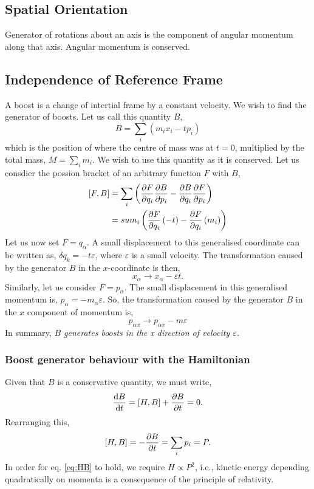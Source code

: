 \documentclass{book}
\begin{document}
\subsection{Spatial Orientation}
Generator of rotations about an axis is the component of angular momentum along that axis. Angular momentum is conserved.
\subsection{Independence of Reference Frame}
A boost is a change of intertial frame by a constant velocity. We wish to find the generator of boosts. Let us call this quantity $B$,
\begin{equation}
	\boxed{B = \sum_i\left(m_ix_i - tp_i\right)}
\end{equation}
which is the position of where the centre of mass was at $t=0$, multiplied by the total mass, $M = \sum_i m_i$. We wish to use this quantity as it is conserved. Let us consdier the possion bracket of an arbitrary function $F$ with $B$,
\begin{equation}
	\begin{split}
		\left[F,B\right] & = \sum_i\left(\pdv{F}{q_i}\pdv{B}{p_i} - \pdv{B}{q_i}\pdv{F}{p_i}\right) \\ 
		& = sum_i\left(\pdv{F}{q_i}\left(-t\right) - \pdv{F}{q_i}\left(m_i\right)\right)
	\end{split}
\end{equation}
Let us now set $F = q_{\alpha}$. A small displacement to this generalised coordinate can be written as, $\delta q_k = -t\varepsilon$, where $\varepsilon$ is a small velocity. The transformation caused by the generator $B$ in the $x$-coordinate is then,
\begin{equation}
	x_{\alpha} \to x_{\alpha} - \varepsilon t.
\end{equation}
Similarly, let us consider $F = p_{\alpha}$. The small displacement in this generalised momentum is, $p_{\alpha} = -m_{\alpha}\varepsilon$. So, the transformation caused by the generator $B$ in the $x$ component of momentum is,
\begin{equation}
	p_{\alpha x} \to p_{\alpha x} - m\varepsilon
\end{equation}
In summary, \textit{$B$ generates boosts in the x direction of velocity $\varepsilon$.}
\subsubsection{Boost generator behaviour with the Hamiltonian}
Given that $B$ is a conservative quantity, we must write,
\begin{equation}
	\dv{B}{t} = \left[H,B\right] + \pdv{B}{t} = 0.
\end{equation}
Rearranging this,
\begin{equation}
	\left[H,B\right] = -\pdv{B}{t} = \sum_ip_i = P. \label{eq:HB}
\end{equation}
In order for eq. \eqref{eq:HB} to hold, we require $H \propto P^2$, i.e., kinetic energy depending quadratically on momenta is a consequence of the principle of relativity.
\end{document}
